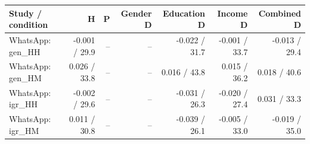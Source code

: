 
\begin{tabular}{lrrrrrr}
\toprule
Study / condition & H & P & Gender D & Education D & Income D & Combined D\\
\midrule
WhatsApp: gen\_HH & -0.001 / 29.9 & -- & -- & -0.022 / 31.7 & -0.001 / 33.7 & -0.013 / 29.4\\
WhatsApp: gen\_HM & 0.026 / 33.8 & -- & -- & 0.016 / 43.8 & 0.015 / 36.2 & 0.018 / 40.6\\
WhatsApp: igr\_HH & -0.002 / 29.6 & -- & -- & -0.031 / 26.3 & -0.020 / 27.4 & 0.031 / 33.3\\
WhatsApp: igr\_HM & 0.011 / 30.8 & -- & -- & -0.039 / 26.1 & -0.005 / 33.0 & -0.019 / 35.0\\
\bottomrule
\end{tabular}
